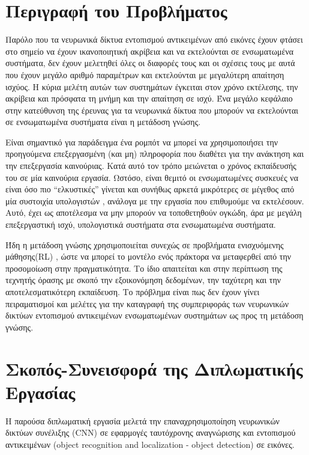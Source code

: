 \section{Περιγραφή του Προβλήματος}
Παρόλο που τα νευρωνικά δίκτυα εντοπισμού αντικειμένων από εικόνες έχουν φτάσει στο σημείο να έχουν ικανοποιητική ακρίβεια και να εκτελούνται σε ενσωματωμένα συστήματα, δεν έχουν μελετηθεί όλες οι διαφορές τους και οι σχέσεις τους με αυτά που έχουν μεγάλο αριθμό παραμέτρων και εκτελούνται με μεγαλύτερη απαίτηση ισχύος. Η κύρια μελέτη αυτών των συστημάτων έγκειται στον χρόνο εκτέλεσης, την ακρίβεια και πρόσφατα τη μνήμη \cite{1} και την απαίτηση σε ισχύ. Ένα μεγάλο κεφάλαιο στην κατεύθυνση της έρευνας για τα νευρωνικά δίκτυα που μπορούν να εκτελούνται σε ενσωματωμένα συστήματα είναι η μετάδοση γνώσης.

Είναι σημαντικό για παράδειγμα ένα ρομπότ να μπορεί να χρησιμοποιήσει την προηγούμενα επεξεργασμένη (και μη) πληροφορία που διαθέτει για την ανάκτηση και την επεξεργασία καινούριας. Κατά αυτό τον τρόπο μειώνεται ο χρόνος εκπαίδευσής του σε μία καινούρια εργασία. Ωστόσο, είναι θεμιτό οι ενσωματωμένες συσκευές να είναι όσο πιο “ελκυστικές” γίνεται και συνήθως αρκετά μικρότερες σε μέγεθος από μία συστοιχία υπολογιστών \cite{70, 71}, ανάλογα με την εργασία που επιθυμούμε να εκτελέσουν. Αυτό, έχει ως αποτέλεσμα να μην μπορούν να τοποθετηθούν ογκώδη, άρα με μεγάλη επεξεργαστική ισχύ, υπολογιστικά συστήματα στα ενσωματωμένα συστήματα.

Ήδη η μετάδοση γνώσης χρησιμοποιείται συνεχώς σε προβλήματα ενισχυόμενης μάθησης(RL) \cite{72, 73}, ώστε να μπορεί το μοντέλο ενός πράκτορα να μεταφερθεί από την προσομοίωση στην πραγματικότητα. Το ίδιο απαιτείται και στην περίπτωση της τεχνητής όρασης με σκοπό την εξοικονόμηση δεδομένων, την ταχύτερη και την αποτελεσματικότερη εκπαίδευση. Το πρόβλημα είναι πως δεν έχουν γίνει πειραματισμοί και μελέτες για την καταγραφή της συμπεριφοράς των νευρωνικών δικτύων εντοπισμού αντικειμένων ενσωματωμένων συστημάτων ως προς τη μετάδοση γνώσης.

\section{Σκοπός-Συνεισφορά της Διπλωματικής Εργασίας}
Η παρούσα διπλωματική εργασία μελετά την επαναχρησιμοποίηση νευρωνικών δικτύων συνέλιξης (CNN) σε εφαρμογές ταυτόχρονης αναγνώρισης και εντοπισμού αντικειμένων (object recognition and localization - object detection) σε εικόνες.

